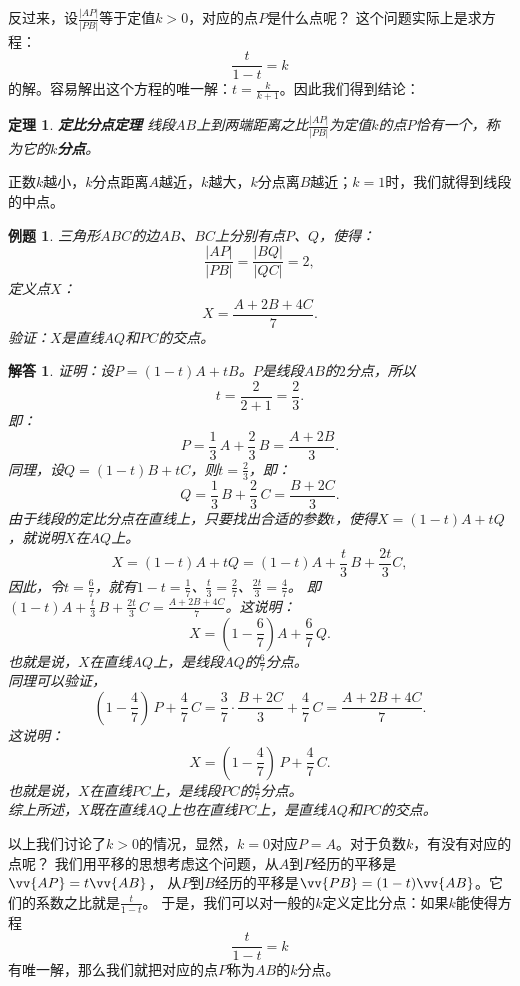 \documentclass[12pt,UTF8]{ctexbook}
\newtheorem{tm}{定理}[section]
\newtheorem{et}{例题}[section]
\newtheorem*{so}{解答}
\begin{document}
反过来，设$ \frac{|AP|}{|PB|}$等于定值$k > 0$，对应的点$P$是什么点呢？
这个问题实际上是求方程：
$$ \frac{t}{1 - t} = k$$
的解。容易解出这个方程的唯一解：$t = \frac{k}{k+1}$。因此我们得到结论：
\begin{tm}{\textbf{定比分点定理} }\label{tm:0-0-10}
    线段$AB$上到两端距离之比$\frac{|AP|}{|PB|}$为定值$k$的点$P$恰有一个，称为它的$k$\textbf{分点}。
\end{tm}
正数$k$越小，$k$分点距离$A$越近，$k$越大，$k$分点离$B$越近；$k=1$时，我们就得到线段的中点。

\begin{et}\label{et:0-0-10}
    三角形$ABC$的边$AB$、$BC$上分别有点$P$、$Q$，使得：
    $$ \frac{|AP|}{|PB|} = \frac{|BQ|}{|QC|} = 2,$$
    定义点$X$：
    $$ X = \frac{A + 2B + 4C}{7}.$$
    验证：$X$是直线$AQ$和$PC$的交点。
\end{et}
\begin{so}
    证明：设$P = (1 - t)A + tB$。$P$是线段$AB$的$2$分点，所以
    $$ t = \frac{2}{2+1} = \frac23. $$
    即：
    $$ P = \frac13\, A + \frac23 \, B = \frac{A + 2B}{3}.$$
    同理，设$Q = (1 - t)B + tC$，则$t = \frac23$，即：
    $$ Q = \frac{1}{3} \, B + \frac{2}{3}\, C = \frac{B + 2C}{3}. $$
    由于线段的定比分点在直线上，只要找出合适的参数$t$，使得$X = (1 - t)A + tQ$，就说明$X$在$AQ$上。
    $$ X = (1 - t)A + tQ = (1 - t)A + \frac{t}{3}\,B + \frac{2t}{3}C,$$
    因此，令$t = \frac{6}{7}$，就有$1 - t = \frac{1}{7}$、$\frac{t}{3} = \frac27$、$\frac{2t}{3} = \frac{4}{7}$。
    即$(1 - t)A + \frac{t}{3} \, B + \frac{2t}{3} \, C = \frac{A + 2B + 4C}{7}$。这说明：
    $$ X = (1 - \frac{6}{7})A + \frac{6}{7} \, Q. $$
    也就是说，$X$在直线$AQ$上，是线段$AQ$的$\frac{6}{7}$分点。\\
    同理可以验证，
    $$ (1 - \frac{4}{7})\, P + \frac{4}{7}\, C = \frac{3}{7} \cdot \frac{B + 2C}{3} + \frac{4}{7} \, C = \frac{A + 2B + 4C}{7}. $$
    这说明：
    $$ X = (1 - \frac{4}{7}) \, P + \frac{4}{7} \, C. $$
    也就是说，$X$在直线$PC$上，是线段$PC$的$\frac{4}{7}$分点。\\
    综上所述，$X$既在直线$AQ$上也在直线$PC$上，是直线$AQ$和$PC$的交点。
\end{so}

以上我们讨论了$k>0$的情况，显然，$k=0$对应$P = A$。对于负数$k$，有没有对应的点呢？
我们用平移的思想考虑这个问题，从$A$到$P$经历的平移是$\vv{AP} = t\vv{AB}$，
从$P$到$B$经历的平移是$\vv{PB} = (1 - t)\vv{AB}$。它们的系数之比就是$ \frac{t}{1 - t}$。
于是，我们可以对一般的$k$定义定比分点：如果$k$能使得方程
$$ \frac{t}{1 - t} = k$$
有唯一解，那么我们就把对应的点$P$称为$AB$的$k$分点。
\end{document}
